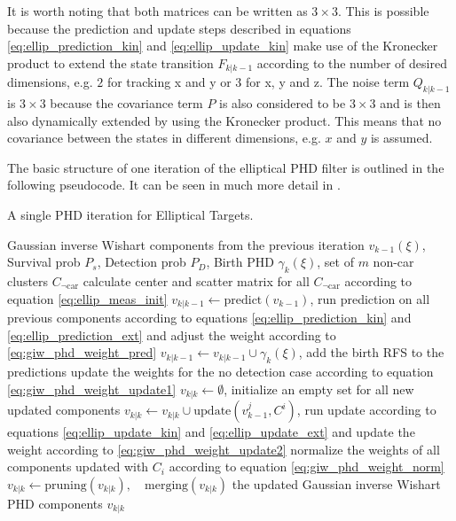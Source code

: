 It is worth noting that both matrices can be written as $3 \times 3$. This is possible because the prediction and update steps described in equations \eqref{eq:ellip_prediction_kin} and \eqref{eq:ellip_update_kin} make use of the Kronecker product to extend the state transition $F_{k|k-1}$ according to the number of desired dimensions, e.g. $2$ for tracking x and y or $3$ for x, y and z. The noise term $Q_{k|k-1}$ is $3 \times 3$ because the covariance term $P$ is also considered to be $3 \times 3$ and is then also dynamically extended by using the Kronecker product. This means that no covariance between the states in different dimensions, e.g. $x$ and $y$ is assumed. 

The basic structure of one iteration of the elliptical PHD filter is outlined in the following pseudocode. It can be seen in much more detail in \cite{giwphdtechnical}.

\begin{algorithm}[H]
\caption{A single PHD iteration for Elliptical Targets.}\label{ellipPHD}
\begin{algorithmic}
\Input Gaussian inverse Wishart components from the previous iteration $v_{k-1}(\xi)$, Survival prob $P_s$, Detection prob $P_D$, Birth PHD $\gamma_k(\xi)$, set of $m$ non-car clusters $C_{\neg \text{car}}$
\Init calculate center and scatter matrix for all $C_{\neg \text{car}}$ according to equation \eqref{eq:ellip_meas_init}
\State 
{}
\State $v_{k|k-1} \leftarrow \text{predict}(v_{k-1})$, run prediction on all previous components according to equations \eqref{eq:ellip_prediction_kin} and \eqref{eq:ellip_prediction_ext} and adjust the weight according to \eqref{eq:giw_phd_weight_pred}
\EndFor
\State $v_{k|k-1} \leftarrow v_{k|k-1} \cup \gamma_k(\xi)$, add the birth RFS to the predictions
\State update the weights for the no detection case according to equation \eqref{eq:giw_phd_weight_update1}
\State $v_{k|k} \leftarrow \emptyset$, initialize an empty set for all new updated components
\State $v_{k|k} \leftarrow v_{k|k} \cup \text{update}(v_{k-1}^j, C^i)$, run update according to equations \eqref{eq:ellip_update_kin} and \eqref{eq:ellip_update_ext} and update the weight according to \eqref{eq:giw_phd_weight_update2}
\EndFor
\State normalize the weights of all components updated with $C_i$ according to equation \eqref{eq:giw_phd_weight_norm}
\EndFor
\State $v_{k|k} \leftarrow \text{pruning}(v_{k|k}),\quad \text{merging}(v_{k|k})$
\Output the updated Gaussian inverse Wishart PHD components $v_{k|k}$
\end{algorithmic}
\end{algorithm}

